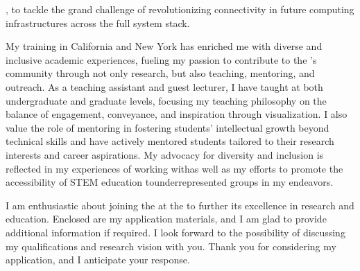, to tackle the grand challenge of revolutionizing connectivity in future computing infrastructures across the full system stack.

My training in California and New York has enriched me with diverse and inclusive academic experiences, fueling my passion to contribute to the \appSchool{}'s community through not only research, but also teaching, mentoring, and outreach. As a teaching assistant and guest lecturer, I have taught at both undergraduate and graduate levels, focusing my teaching philosophy on the balance of engagement, conveyance, and inspiration through visualization. I also value the role of mentoring in fostering students' intellectual growth beyond technical skills and have actively mentored students tailored to their research interests and career aspirations. My advocacy for diversity and inclusion is reflected in my experiences of working with\textemdash as well as my efforts to promote the accessibility of STEM education to\textemdash underrepresented groups in my endeavors.

I am enthusiastic about joining the \appDept{} at the \appSchool{} to further its excellence in research and education. Enclosed are my application materials, and I am glad to provide additional information if required. I look forward to the possibility of discussing my qualifications and research vision with you. Thank you for considering my application, and I anticipate your response.

